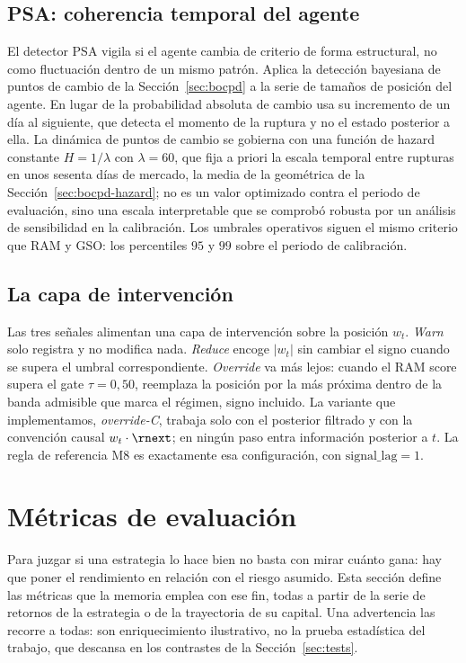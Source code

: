 \subsection{PSA: coherencia temporal del agente}
\label{sec:strata-psa}

El detector PSA vigila si el agente cambia de criterio de forma estructural, no como fluctuación dentro de un mismo patrón. Aplica la detección bayesiana de puntos de cambio de la Sección~\ref{sec:bocpd} a la serie de tamaños de posición del agente. En lugar de la probabilidad absoluta de cambio usa su incremento de un día al siguiente, que detecta el momento de la ruptura y no el estado posterior a ella. La dinámica de puntos de cambio se gobierna con una función de hazard constante $H = 1/\lambda$ con $\lambda = 60$, que fija a priori la escala temporal entre rupturas en unos sesenta días de mercado, la media de la geométrica de la Sección~\ref{sec:bocpd-hazard}; no es un valor optimizado contra el periodo de evaluación, sino una escala interpretable que se comprobó robusta por un análisis de sensibilidad en la calibración. Los umbrales operativos siguen el mismo criterio que RAM y GSO: los percentiles $95$ y $99$ sobre el periodo de calibración.

\subsection{La capa de intervención}
\label{sec:strata-intervencion}

Las tres señales alimentan una capa de intervención sobre la posición $w_t$. \emph{Warn} solo registra y no modifica nada. \emph{Reduce} encoge $|w_t|$ sin cambiar el signo cuando se supera el umbral correspondiente. \emph{Override} va más lejos: cuando el RAM score supera el gate $\tau = 0{,}50$, reemplaza la posición por la más próxima dentro de la banda admisible que marca el régimen, signo incluido. La variante que implementamos, \emph{override-C}, trabaja solo con el posterior filtrado y con la convención causal $w_t \cdot \rnext$; en ningún paso entra información posterior a $t$. La regla de referencia M8 es exactamente esa configuración, con $\mathrm{signal\_lag} = 1$.

\section{Métricas de evaluación}
\label{sec:metricas}

Para juzgar si una estrategia lo hace bien no basta con mirar cuánto gana: hay que poner el rendimiento en relación con el riesgo asumido. Esta sección define las métricas que la memoria emplea con ese fin, todas a partir de la serie de retornos de la estrategia o de la trayectoria de su capital. Una advertencia las recorre a todas: son enriquecimiento ilustrativo, no la prueba estadística del trabajo, que descansa en los contrastes de la Sección~\ref{sec:tests}.


